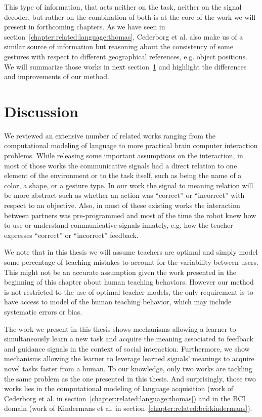 \transition

This type of information, that acts neither on the task, neither on the signal decoder, but rather on the combination of both is at the core of the work we will present in forthcoming chapters. As we have seen in section~\ref{chapter:related:language:thomas}, Cederborg et al. also make us of a similar source of information but reasoning about the consistency of some gestures with respect to different geographical references, e.g. object positions. We will summarize those works in next section~\ref{chapter:related:discussion} and highlight the differences and improvements of our method.

\section{Discussion}
\label{chapter:related:discussion}

We reviewed an extensive number of related works ranging from the computational modeling of language to more practical brain computer interaction problems. While releasing some important assumptions on the interaction, in most of those works the communicative signals had a direct relation to one element of the environment or to the task itself, such as being the name of a color, a shape, or a gesture type. In our work the signal to meaning relation will be more abstract such as whether an action was ``correct'' or ``incorrect'' with respect to an objective. Also, in most of these existing works the interaction between partners was pre-programmed and most of the time the robot knew how to use or understand communicative signals innately, e.g. how the teacher expresses ``correct'' or ``incorrect'' feedback. 



We note that in this thesis we will assume teachers are optimal and simply model some percentage of teaching mistakes to account for the variability between users. This might not be an accurate assumption given the work presented in the beginning of this chapter about human teaching behaviors. However our method is not restricted to the use of optimal teacher models, the only requirement is to have access to model of the human teaching behavior, which may include systematic errors or bias.

The work we present in this thesis shows mechanisms allowing a learner to simultaneously learn a new task and acquire the meaning associated to feedback and guidance signals in the context of social interaction. Furthermore, we show mechanisms allowing the learner to leverage learned signals' meanings to acquire novel tasks faster from a human. To our knowledge, only two works are tackling the same problem as the one presented in this thesis. And surprisingly, those two works lies in the computational modeling of language acquisition (work of Cederborg et al. in section~\ref{chapter:related:language:thomas}) and in the BCI domain (work of Kindermans et al. in section~\ref{chapter:related:bci:kindermans}). 

